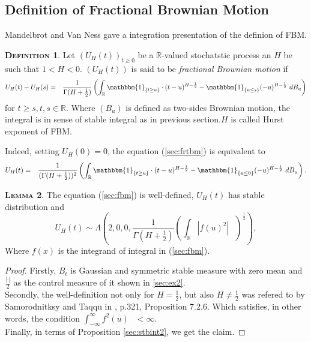 \documentclass[a4paper, twoside, 11pt]{article}
\theoremstyle{definition}
\newtheorem{definition}{\scshape Definition}[section]
\newtheorem{lemma}[definition]{\scshape Lemma}
\newcommand{\brkt}[1]{\left({#1} \right)}
\begin{document}
\subsection{Definition of Fractional Brownian Motion}
Mandelbrot and Van Ness \cite{mandelbrot} gave a integration presentation of the definion of FBM.
\begin{definition}
  Let $(U_H(t))_{t\ge 0}$ be a $\mathbb{R}$-valued stochatstic process an $H$ be such that $1<H<0$. $(U_H(t))$ is said to be \emph{fractional Brownian motion} if 
  \begin{eqnarray}
	U_H(t) - U_H(s) &=& \frac{1}{\Gamma(H+\frac{1}{2})}\brkt{\int_{\mathbb{R}} \mathbbm{1}_{\{t\ge u\}}\cdot (t-u)^{H-\frac{1}{2}} - \mathbbm{1}_{\{u\le s\}} (-u)^{H-\frac{1}{2}} \, \mathop{dB_u}}
	\label{sec:frtbm}
  \end{eqnarray}
  for $t\ge s, t, s \in \mathbb{R}$. Where $(B_u)$ is defined as two-sides Brownian motion, the integral is in sense of stable integral as in previous section.$H$ is called Hurst exponent of FBM.
\end{definition}

Indeed, setting $U_H(0) = 0$, the equation (\ref{sec:frtbm}) is equivalent to
	 \begin{eqnarray}
	   U_H(t) &=& \frac{1}{(\Gamma(H+\frac{1}{2}))^2}\brkt{\int_{\mathbb{R}} \mathbbm{1}_{\{t\ge u\}}\cdot (t-u)^{H-\frac{1}{2}} - \mathbbm{1}_{\{u\le 0\}} (-u)^{H-\frac{1}{2}} \, \mathop{dB_u}}.
	\label{sec:fbm}
  \end{eqnarray}

\begin{lemma}
  The equation (\ref{sec:fbm}) is well-defined, $U_H(t)$ has stable distribution and 
  \begin{equation*}
	U_H(t) \sim \Lambda(2, 0, 0, \frac{1}{\Gamma(H+\frac{1}{2})}(\int_{\mathbb{R}} |f(u)^2|\, \mathop{\frac{du}{2}})^\frac{1}{2}),
  \end{equation*}
  Where $f(x)$ is the integrand of integral in (\ref{sec:fbm}).
  \label{sec:l2}
\end{lemma}
\begin{proof}
  Firstly, $B_t$ is Gaussian and symmetric stable measure with zero mean and $\frac{|\cdot|}{2}$ as the control measure of it shown in \ref{sec:ex2}. \\
  Secondly, the well-definition not only for $H= \frac{1}{2}$, but also $H\neq \frac{1}{2}$ was refered to by Samorodnitksy and Taqqu in \cite{samorodnitsky}, p.321, Proposition 7.2.6. Which satisfies, in other words, the condition $\int_{-\infty}^{\infty}f^2(u)\,\mathop{\frac{du}{2}} < \infty$.\\
  Finally, in terms of Proposition \ref{sec:stbint2}, we get the claim.
\end{proof}
	
\end{document}
